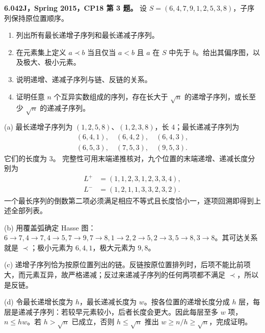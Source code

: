 \begin{exercise}\label{mit:6042-cp18-q3}
\textbf{6.042J，Spring 2015，CP18 第 3 题。}
设 $S=(6,4,7,9,1,2,5,3,8)$，子序列保持原位置顺序。
\begin{enumerate}[label=(\alph*)]
\item 列出所有最长递增子序列和最长递减子序列。
\item 在元素集上定义 $a\prec b$ 当且仅当 $a<b$ 且 $a$ 在 $S$ 中先于 $b$。给出其偏序图，以及极大、极小元素。
\item 说明递增、递减子序列与链、反链的关系。
\item 证明任意 $n$ 个互异实数组成的序列，存在长大于 $\sqrt n$ 的递增子序列，或长至少 $\sqrt n$ 的递减子序列。
\end{enumerate}
\end{exercise}
\begin{solution}
(a) 最长递增子序列为 $(1,2,5,8)$、$(1,2,3,8)$，长 $4$；最长递减子序列为
\[
\begin{gathered}
(6,4,1),\quad(6,4,2),\quad(6,4,3),\\
(6,5,3),\quad(7,5,3),\quad(9,5,3).
\end{gathered}
\]
它们的长度为 $3$。
完整性可用末端递推核对，九个位置的末端递增、递减长度分别为
\[
\begin{aligned}
L^+&=(1,1,2,3,1,2,3,3,4),\\
L^-&=(1,2,1,1,3,3,2,3,2).
\end{aligned}
\]
一个最长序列的倒数第二项必须满足相应不等式且长度恰小一，逐项回溯即得到上述全部列表。

(b) 用覆盖弧确定 Hasse 图：$6\to7,4\to7,4\to5,7\to9,7\to8,1\to2,2\to5,2\to3,5\to8,3\to8$。其可达关系就是 $\prec$；极小元素为 $6,4,1$，极大元素为 $9,8$。

(c) 递增子序列恰为按原位置列出的链。反链按原位置排列时，后项不能比前项大，而元素互异，故严格递减；反过来递减子序列的任何两项都不满足 $\prec$，所以是反链。

(d) 令最长递增长度为 $h$，最长递减长度为 $w$。按各位置的递增长度分成 $h$ 层，每层是递减子序列：若较早元素较小，后者长度会更大。因此每层至多 $w$ 项，$n\le hw$。若 $h>\sqrt n$ 已成立，否则 $h\le\sqrt n$ 推出 $w\ge n/h\ge\sqrt n$，完成证明。
\end{solution}
